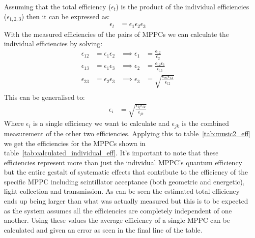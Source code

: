 Assuming that the total efficiency (\( \epsilon_t \)) is the product of the individual efficiencies (\( \epsilon_{1,2,3} \)) then it can be expressed as:
\begin{align}
  \epsilon_t &= \epsilon_1  \epsilon_2  \epsilon_3
\end{align}
With the measured efficiencies of the pairs of MPPCs we can calculate the individual efficiencies by solving:
\begin{align*}
  \epsilon_{12} &= \epsilon_{1} \epsilon_{2} &\implies   \epsilon_{1}  &= \frac{\epsilon_{12}}{\epsilon_{2}}                       \\
  \epsilon_{13} &= \epsilon_{1} \epsilon_{3} &\implies   \epsilon_{2}  &= \frac{\epsilon_{12}\epsilon_{3}}{\epsilon_{13}}          \\
  \epsilon_{23} &= \epsilon_{2} \epsilon_{3} &\implies   \epsilon_{3}  &= \sqrt{\frac{\epsilon_{23}\epsilon_{13}}{\epsilon_{12}}}  \\
\end{align*} 
This can be generalised to:
\begin{align*}
  \epsilon_{i} &= \sqrt{\frac{\epsilon_{ij}\epsilon_{ik}}{\epsilon_{jk}}} \label{equ:individual_eff}
\end{align*}
Where \( \epsilon_i \) is a single efficiency we want to calculate and \( \epsilon_{jk} \) is the combined measurement of the other two efficiencies. Applying this to table~\ref{tab:music2_eff} we get the efficiencies for the MPPCs shown in table~\ref{tab:calculated_individual_eff}. It's important to note that these efficiencies represent more than just the individual MPPC's quantum efficiency but the entire gestalt of systematic effects that contribute to the efficiency of the specific MPPC including scintillator acceptance (both geometric and energetic), light collection and transmission. As can be seen the estimated total efficiency ends up being larger than what was actually measured but this is to be expected as the system assumes all the efficiencies are completely independent of one another. Using these values the average efficiency of a single MPPC can be calculated and given an error as seen in the final line of the table.

